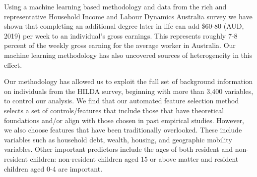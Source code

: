 \documentclass[12pt, a4paper]{article}
\begin{document}
Using a machine learning based methodology and data from the rich and
representative Household Income and Labour Dynamics Australia survey we have
shown that completing an additional degree later in life can add \$60-80 (AUD,
2019) per week to an individual's gross earnings. This represents roughly 7-8
percent of the weekly gross earning for the average worker in Australia. Our
machine learning methodology has also uncovered sources of heterogeneity in
this effect.

Our methodology has allowed us to exploit the full set of background
information on individuals from the HILDA survey, beginning with more than
3,400 variables, to control our analysis. 
We find that our automated feature selection method selects a set of
controls/features that include those that have theoretical foundations and/or
align with those chosen in past empirical studies. However, we also choose
features that have been traditionally overlooked. These include variables such
as household debt, wealth, housing, and geographic mobility variables. Other
important predictors include the ages of both resident and non-resident
children: non-resident children aged 15 or above matter and resident children
aged 0-4 are important.


\end{document}
